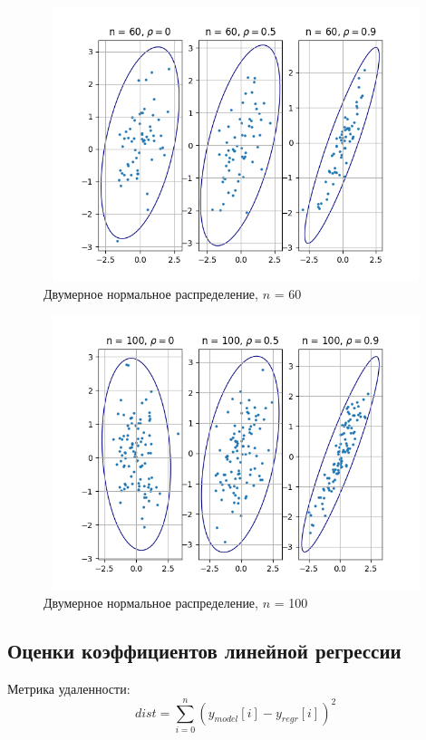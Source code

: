 \documentclass[main.tex]{subfiles}
\begin{document}
\begin{figure}[ht]
	\centering
	\includegraphics[width = 13cm, height = 8cm]{../images/ellipse/5_60.png}
	\caption{Двумерное нормальное распределение, $n$ = 60}
	\label{fig:n60}
\end{figure}

\begin{figure}[ht]
	\centering
	\includegraphics[width = 13cm, height = 8cm]{../images/ellipse/5_100.png}
	\caption{Двумерное нормальное распределение, $n$ = 100}
	\label{fig:n100}
\end{figure}

\FloatBarrier
\subsection{Оценки коэффициентов линейной регрессии}

\noindent Метрика удаленности: 
\begin{equation} \label{eq:metric}
	dist = \sum_{i=0}^{n}(y_{model}[i]-y_{regr}[i])^2
\end{equation}
\end{document}
